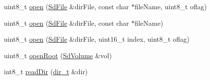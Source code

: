 \begin{DoxyCompactItemize}
\item 
uint8\+\_\+t \hyperlink{class_sd_file_afe1d8ce70ef58ee5967005047064167c}{open} (\hyperlink{class_sd_file}{Sd\+File} \&dir\+File, const char $\ast$file\+Name, uint8\+\_\+t oflag)
\item 
uint8\+\_\+t \hyperlink{class_sd_file_a71e1c08dc4fb58b95554925a25435721}{open} (\hyperlink{class_sd_file}{Sd\+File} \&dir\+File, const char $\ast$file\+Name)
\item 
uint8\+\_\+t \hyperlink{class_sd_file_a8bc20433f081a6e9f1546601b7a1d712}{open} (\hyperlink{class_sd_file}{Sd\+File} \&dir\+File, uint16\+\_\+t index, uint8\+\_\+t oflag)
\item 
uint8\+\_\+t \hyperlink{class_sd_file_abc60bbbb747c58319cfcfc11deb34d53}{open\+Root} (\hyperlink{class_sd_volume}{Sd\+Volume} \&vol)
\item 
int8\+\_\+t \hyperlink{class_sd_file_ad107b73c6edfa489b76366edfef2eeae}{read\+Dir} (\hyperlink{_fat_structs_8h_a803db59d4e16a0c54a647afc6a7954e3}{dir\+\_\+t} \&dir)
\end{DoxyCompactItemize}
